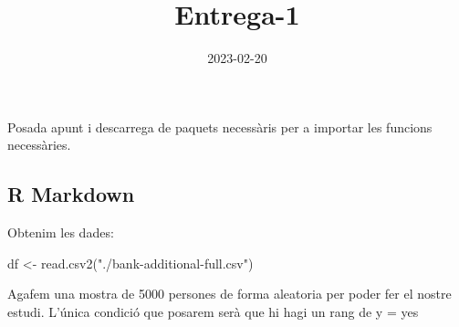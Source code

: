 \documentclass[
]{article}
\title{Entrega-1}
\author{}
\date{\vspace{-2.5em}2023-02-20}
\newenvironment{Shaded}{\begin{snugshade}}{\end{snugshade}}
\newcommand{\AttributeTok}[1]{\textcolor[rgb]{0.77,0.63,0.00}{#1}}
\newcommand{\DecValTok}[1]{\textcolor[rgb]{0.00,0.00,0.81}{#1}}
\newcommand{\FunctionTok}[1]{\textcolor[rgb]{0.00,0.00,0.00}{#1}}
\newcommand{\NormalTok}[1]{#1}
\newcommand{\OtherTok}[1]{\textcolor[rgb]{0.56,0.35,0.01}{#1}}
\newcommand{\SpecialCharTok}[1]{\textcolor[rgb]{0.00,0.00,0.00}{#1}}
\newcommand{\StringTok}[1]{\textcolor[rgb]{0.31,0.60,0.02}{#1}}
\begin{document}
\maketitle

Posada apunt i descarrega de paquets necessàris per a importar les
funcions necessàries.

\hypertarget{r-markdown}{%
\subsection{R Markdown}\label{r-markdown}}

Obtenim les dades:

\begin{Shaded}
\begin{Highlighting}[]
\NormalTok{df }\OtherTok{\textless{}{-}} \FunctionTok{read.csv2}\NormalTok{(}\StringTok{"./bank{-}additional{-}full.csv"}\NormalTok{)}
\end{Highlighting}
\end{Shaded}

Agafem una mostra de 5000 persones de forma aleatoria per poder fer el
nostre estudi. L'única condició que posarem serà que hi hagi un rang de
y = yes

\begin{Shaded}
\end{Shaded}
\end{document}
